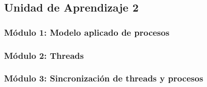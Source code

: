 \subsection{Unidad de Aprendizaje 2}

\subsubsection{Módulo 1: Modelo aplicado de procesos}

\subsubsection{Módulo 2: Threads}

\subsubsection{Módulo 3: Sincronización de threads y procesos}